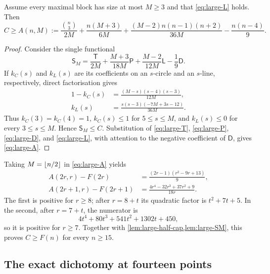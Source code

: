 \begin{lemma}
\label{lem:large-SM}
Assume every maximal block has size at most $M\geq3$ and that
\eqref{eq:large-L} holds.  Then
\begin{equation}
 C\geq A(n,M):=
 \frac{\binom n3}{2M}+\frac{n(M+3)}{6M}
 +\frac{(M-2)n(n-1)(n+2)}{36M}-\frac{n(n-4)}9.
                                                               \label{eq:large-A}
\end{equation}
\end{lemma}

\begin{proof}
Consider the single functional
\begin{equation}
 \mathsf S_M=\frac{\mathsf T}{2M}
 +\frac{M+3}{18M}\mathsf P
 +\frac{M-2}{12M}\mathsf L-\frac19\mathsf D.      \label{eq:large-SM}
\end{equation}
If $k_C(s)$ and $k_L(s)$ are its coefficients on an $s$-circle and an
$s$-line, respectively, direct factorisation gives
\begin{align}
 1-k_C(s)&=\frac{(M-s)(s-4)(s-3)}{12M},            \label{eq:large-circle-slack}\\
 k_L(s)&=\frac{s(s-3)(-7M+3s-12)}{36M}.            \label{eq:large-line-slack}
\end{align}
Thus $k_C(3)=k_C(4)=1$, $k_C(s)\leq1$ for $5\leq s\leq M$, and
$k_L(s)\leq0$ for every $3\leq s\leq M$.  Hence
$\mathsf S_M\leq C$.  Substitution of
\eqref{eq:large-T}, \eqref{eq:large-P}, \eqref{eq:large-D}, and
\eqref{eq:large-L}, with attention to the negative coefficient of
$\mathsf D$, gives \eqref{eq:large-A}.
\end{proof}

Taking $M=\left\lfloor n/2\right\rfloor$ in \eqref{eq:large-A} yields
\begin{align}
 A(2r,r)-F(2r)&=\frac{(2r-1)(r^2-9r+13)}9,
                                                               \label{eq:large-even-gap}\\
 A(2r+1,r)-F(2r+1)&=
 \frac{4r^4-32r^3+37r^2+9}{18r}.                  \label{eq:large-odd-gap}
\end{align}
The first is positive for $r\geq8$; after $r=8+t$ its quadratic factor is
$t^2+7t+5$.  In the second, after $r=7+t$, the numerator is
\[
 4t^4+80t^3+541t^2+1302t+450,
\]
so it is positive for $r\geq7$.  Together with
\cref{lem:large-half-cap,lem:large-SM}, this proves $C\geq F(n)$ for
every $n\geq15$.

\subsection{The exact dichotomy at fourteen points}

